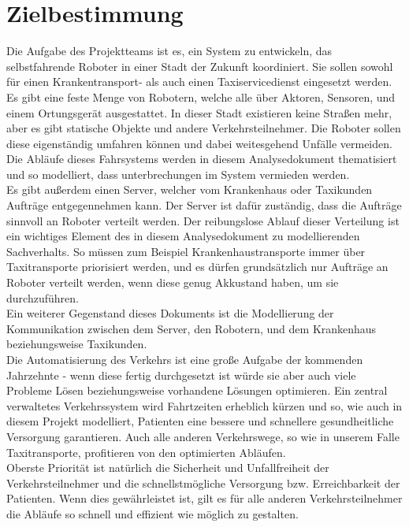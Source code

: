 
\section{Zielbestimmung}
Die Aufgabe des Projektteams ist es, ein System zu entwickeln, das selbstfahrende Roboter in einer Stadt der Zukunft koordiniert. 
Sie sollen sowohl für einen Krankentransport- als auch einen Taxiservicedienst eingesetzt werden. \\

Es gibt eine feste Menge von Robotern, welche alle über Aktoren, Sensoren, und einem Ortungsgerät ausgestattet. 
In dieser Stadt existieren keine Straßen mehr, aber es gibt statische Objekte und andere Verkehrsteilnehmer. 
Die Roboter sollen diese  eigenständig umfahren können und dabei weitesgehend Unfälle vermeiden. 
Die Abläufe dieses Fahrsystems werden in diesem Analysedokument thematisiert und so modelliert, dass unterbrechungen im System vermieden werden.\\ 

Es gibt außerdem einen Server, welcher vom Krankenhaus oder Taxikunden Aufträge entgegennehmen kann. 
Der Server ist dafür zuständig, dass die Aufträge sinnvoll an Roboter verteilt werden. 
Der reibungslose Ablauf dieser Verteilung ist ein wichtiges Element des in diesem Analysedokument zu modellierenden Sachverhalts. 
So müssen zum Beispiel Krankenhaustransporte immer über Taxitransporte priorisiert werden, und es dürfen grundsätzlich nur Aufträge an Roboter verteilt werden, wenn diese genug Akkustand haben, um sie durchzuführen.\\

Ein weiterer Gegenstand dieses Dokuments ist die Modellierung der Kommunikation zwischen dem Server, den Robotern, und dem Krankenhaus beziehungsweise Taxikunden.\\

Die Automatisierung des Verkehrs ist eine große Aufgabe der kommenden Jahrzehnte - wenn diese fertig durchgesetzt ist würde sie aber auch viele Probleme Lösen beziehungsweise vorhandene Lösungen optimieren. Ein zentral verwaltetes Verkehrssystem wird Fahrtzeiten erheblich kürzen und so, wie auch in diesem Projekt modelliert, Patienten eine bessere und schnellere gesundheitliche Versorgung garantieren. Auch alle anderen Verkehrswege, so wie in unserem Falle Taxitransporte, profitieren von den optimierten Abläufen.\\

Oberste Priorität ist natürlich die Sicherheit und Unfallfreiheit der Verkehrsteilnehmer und die schnellstmögliche Versorgung bzw. Erreichbarkeit der Patienten. Wenn dies gewährleistet ist, gilt es für alle anderen Verkehrsteilnehmer die Abläufe so schnell und effizient wie möglich zu gestalten.\\

 

\pagebreak
